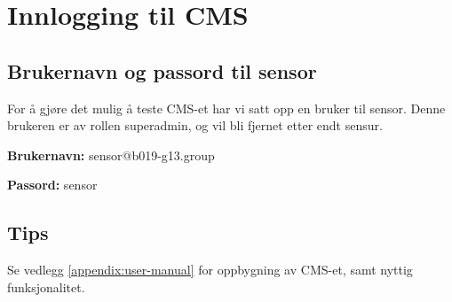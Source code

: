 \cleardoublepage
\chapter{Innlogging til CMS}
\label{appendix:login-cms} 

\section{Brukernavn og passord til sensor}
For å gjøre det mulig å teste CMS-et har vi satt opp en bruker til sensor. Denne brukeren er av rollen superadmin, og vil bli fjernet etter endt sensur.

\textbf{Brukernavn:}
sensor@b019-g13.group


\textbf{Passord:}
sensor

\section{Tips}
Se vedlegg \ref{appendix:user-manual} for oppbygning av CMS-et, samt nyttig funksjonalitet.